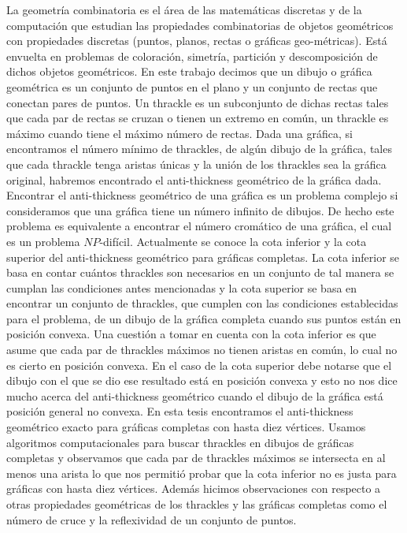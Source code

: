 La geometría combinatoria es el área de las matemáticas discretas y de la computación que estudian las
propiedades combinatorias de objetos geométricos con propiedades discretas (puntos, planos, rectas o
gráficas geo\hyp métricas). Está envuelta en problemas de coloración, simetría, partición y descomposición de
dichos objetos geométricos. En este trabajo decimos que un dibujo o gráfica geométrica es un conjunto de
puntos en el plano y un conjunto de rectas que conectan pares de puntos. Un thrackle es un subconjunto de
dichas rectas tales que cada par de rectas se cruzan o tienen un extremo en común, un thrackle es máximo
cuando tiene el máximo número de rectas. Dada una gráfica, si encontramos el número mínimo de thrackles, de
algún dibujo de la gráfica, tales que cada thrackle tenga aristas únicas y la unión de los thrackles sea la
gráfica original, habremos encontrado el anti-thickness geométrico de la gráfica dada. Encontrar el
anti-thickness geométrico de una gráfica es un problema complejo si consideramos que una gráfica tiene un
número infinito de dibujos. De hecho este problema es equivalente a encontrar el número cromático de una
gráfica, el cual es un problema $NP$-difícil.
Actualmente se conoce la cota inferior y la cota superior del anti-thickness
geométrico para gráficas completas. La cota inferior se basa en contar cuántos thrackles son
necesarios en un conjunto de tal manera se cumplan las condiciones antes mencionadas y la cota superior se
basa en encontrar un conjunto de thrackles, que cumplen con las condiciones establecidas para el problema,
de un dibujo de la gráfica completa cuando sus puntos están en posición convexa. Una cuestión a tomar en
cuenta con la cota inferior es que asume que cada par de thrackles máximos no tienen aristas en común, lo
cual no es cierto en posición convexa. En el caso de la cota superior debe notarse que el dibujo con el que
se dio ese resultado está en posición convexa y esto no nos dice mucho acerca del anti-thickness geométrico
cuando el dibujo de la gráfica está posición general no convexa. En esta tesis encontramos el
anti-thickness geométrico exacto para gráficas completas con hasta diez vértices. Usamos algoritmos
computacionales para buscar thrackles en dibujos de gráficas completas y observamos que cada par de
thrackles máximos se intersecta en al menos una arista lo que nos permitió probar que la cota inferior no
es justa para gráficas con hasta diez vértices. Además hicimos observaciones con respecto a otras
propiedades geométricas de los thrackles y las gráficas completas como el número de cruce y la reflexividad
de un conjunto de puntos.
